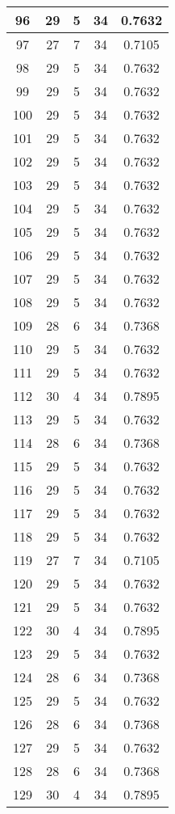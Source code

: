 \documentclass[letterpaper, 12pt]{article}
\begin{document}
\begin{longtable}{|c|c|c|c|c|}
\hline
96 & 29 & 5 & 34 & 0.7632 \\
\hline
97 & 27 & 7 & 34 & 0.7105 \\
\hline
98 & 29 & 5 & 34 & 0.7632 \\
\hline
99 & 29 & 5 & 34 & 0.7632 \\
\hline
100 & 29 & 5 & 34 & 0.7632 \\
\hline
101 & 29 & 5 & 34 & 0.7632 \\
\hline
102 & 29 & 5 & 34 & 0.7632 \\
\hline
103 & 29 & 5 & 34 & 0.7632 \\
\hline
104 & 29 & 5 & 34 & 0.7632 \\
\hline
105 & 29 & 5 & 34 & 0.7632 \\
\hline
106 & 29 & 5 & 34 & 0.7632 \\
\hline
107 & 29 & 5 & 34 & 0.7632 \\
\hline
108 & 29 & 5 & 34 & 0.7632 \\
\hline
109 & 28 & 6 & 34 & 0.7368 \\
\hline
110 & 29 & 5 & 34 & 0.7632 \\
\hline
111 & 29 & 5 & 34 & 0.7632 \\
\hline
112 & 30 & 4 & 34 & 0.7895 \\
\hline
113 & 29 & 5 & 34 & 0.7632 \\
\hline
114 & 28 & 6 & 34 & 0.7368 \\
\hline
115 & 29 & 5 & 34 & 0.7632 \\
\hline
116 & 29 & 5 & 34 & 0.7632 \\
\hline
117 & 29 & 5 & 34 & 0.7632 \\
\hline
118 & 29 & 5 & 34 & 0.7632 \\
\hline
119 & 27 & 7 & 34 & 0.7105 \\
\hline
120 & 29 & 5 & 34 & 0.7632 \\
\hline
121 & 29 & 5 & 34 & 0.7632 \\
\hline
122 & 30 & 4 & 34 & 0.7895 \\
\hline
123 & 29 & 5 & 34 & 0.7632 \\
\hline
124 & 28 & 6 & 34 & 0.7368 \\
\hline
125 & 29 & 5 & 34 & 0.7632 \\
\hline
126 & 28 & 6 & 34 & 0.7368 \\
\hline
127 & 29 & 5 & 34 & 0.7632 \\
\hline
128 & 28 & 6 & 34 & 0.7368 \\
\hline
129 & 30 & 4 & 34 & 0.7895 \\

\end{longtable}
\end{document}

